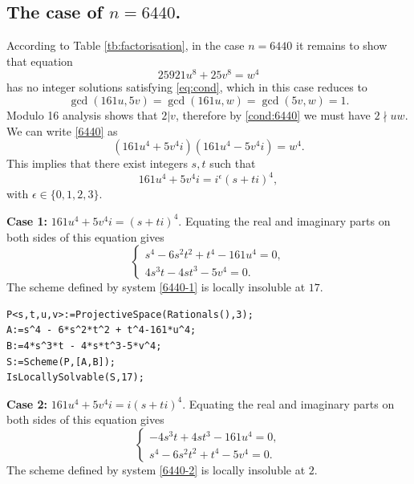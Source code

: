 \documentclass[a4paper,12pt,english,reqno]{amsart}
\begin{document}
\subsection{The case of $n=6440$.}%
According to Table \ref{tb:factorisation}, in the case $n=6440$ it remains to
show that equation
\begin{equation}\label{6440}
25921 u^8 + 25 v^8= w^4
\end{equation}
has no integer solutions satisfying \eqref{eq:cond}, which in this case reduces to 
\begin{equation}\label{cond:6440}
\gcd(161u,5v)=\gcd(161u,w)=\gcd(5v,w)=1.
\end{equation}
Modulo 16 analysis shows that $2|v$, therefore by \eqref{cond:6440} we must have $2\nmid uw$. We can write \eqref{6440} as
\begin{equation} (161u^4+5v^4i)(161u^4-5v^4i)=w^4.
\end{equation}
This implies that there exist integers $s,t$ such that 
\[161u^4+5v^4i=i^{\epsilon}(s+ti)^4,\]
with $\epsilon \in \{0,1,2,3\}$.


{\bf Case 1:} $161u^4+5v^4i=(s+ti)^4$. Equating the real and imaginary parts on both sides of this equation gives
\begin{equation}\label{6440-1}
\begin{cases}
s^4 - 6s^2t^2 + t^4 - 161u^4=0,\\
4s^3t - 4st^3 - 5v^4=0.
\end{cases}
\end{equation}
The scheme defined by system \eqref{6440-1} is locally insoluble at $17$.


\begin{lstlisting}
P<s,t,u,v>:=ProjectiveSpace(Rationals(),3);
A:=s^4 - 6*s^2*t^2 + t^4-161*u^4;
B:=4*s^3*t - 4*s*t^3-5*v^4;
S:=Scheme(P,[A,B]);
IsLocallySolvable(S,17);
\end{lstlisting}

{\bf Case 2:} $161u^4+5v^4i=i(s+ti)^4$. Equating the real and imaginary parts on both sides of this equation gives
\begin{equation}\label{6440-2}
\begin{cases}
-4s^3t + 4st^3 - 161u^4=0,\\
s^4 - 6s^2t^2 + t^4 - 5v^4=0.
\end{cases}
\end{equation}
The scheme defined by system \eqref{6440-2} is locally insoluble at $2$.
\end{document}
